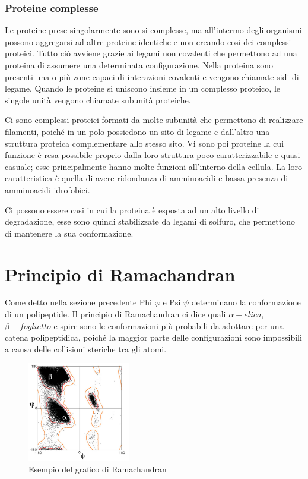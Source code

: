 \subsubsection{Proteine complesse}\label{subsec:es_subsec}
Le proteine prese singolarmente sono si complesse, ma all'intermo degli organismi possono aggregarsi ad altre proteine identiche e non creando cosi dei complessi
proteici. Tutto ciò avviene grazie ai legami non covalenti che permettono ad una proteina di assumere una determinata configurazione. Nella proteina sono presenti 
una o più zone capaci di interazioni covalenti e vengono chiamate sidi di legame. Quando le proteine si uniscono insieme in un complesso proteico, le singole unità 
vengono chiamate subunità proteiche.

Ci sono complessi proteici formati da molte subunità che permettono di realizzare filamenti, poiché in un polo possiedono un sito di legame e dall'altro una struttura
proteica complementare allo stesso sito. Vi sono poi proteine la cui funzione è resa possibile proprio dalla loro struttura poco caratterizzabile e quasi casuale;
esse principalmente hanno molte funzioni all'interno della cellula. La loro caratteristica è quella di avere ridondanza di amminoacidi e bassa presenza di 
amminoacidi idrofobici. 

Ci possono essere casi in cui la proteina è esposta ad un alto livello di degradazione, esse sono quindi stabilizzate da legami di solfuro, che permettono di 
mantenere la sua conformazione.

\section{Principio di Ramachandran}\label{sec:cap_sec_subsec}
Come detto nella sezione precedente Phi $\varphi$ e Psi $\psi$ determinano la conformazione di un polipeptide. Il principio di Ramachandran ci dice quali $\alpha-elica$, 
$\beta-foglietto$ e spire sono le conformazioni più probabili da adottare per una catena polipeptidica, poiché la maggior parte delle configurazioni sono 
impossibili a causa delle collisioni steriche tra gli atomi. 

\begin{figure}
    \centering
    \includegraphics[width=0.4\textwidth]{Immagini/GraficoRamachandran.png}
    \caption{Esempio del grafico di Ramachandran}
    \label{fig:Amminoacido}
\end{figure}

